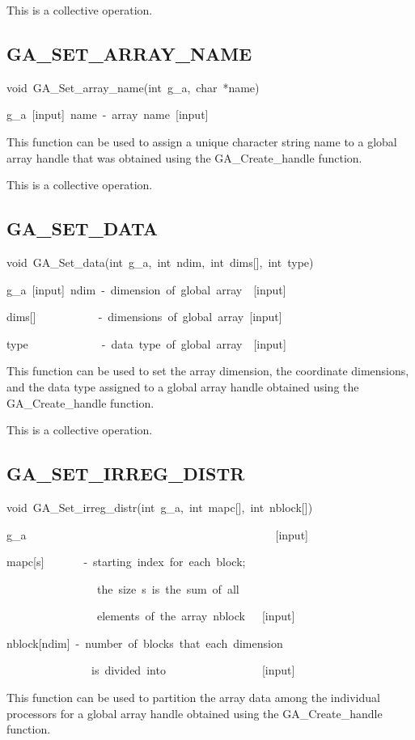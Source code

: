 This is a collective operation. 


\subsection*{\label{sub:GA_SET_ARRAY_NAME}GA\_SET\_ARRAY\_NAME}
\begin{lyxcode}
void~GA\_Set\_array\_name(int~g\_a,~char~{*}name)



g\_a~{[}input{]}~name~-~array~name~{[}input{]}
\end{lyxcode}
This function can be used to assign a unique character string name
to a global array handle that was obtained using the GA\_Create\_handle
function.

This is a collective operation. 


\subsection*{\label{sub:GA_SET_DATA}GA\_SET\_DATA}
\begin{lyxcode}
void~GA\_Set\_data(int~g\_a,~int~ndim,~int~dims{[}{]},~int~type)



g\_a~{[}input{]}~ndim~-~dimension~of~global~array~~{[}input{]}~

dims{[}{]}~~~~~~~~~~~-~dimensions~of~global~array~{[}input{]}~

type~~~~~~~~~~~~~-~data~type~of~global~array~~{[}input{]}
\end{lyxcode}
This function can be used to set the array dimension, the coordinate
dimensions, and the data type assigned to a global array handle obtained
using the GA\_Create\_handle function.

This is a collective operation. 


\subsection*{\label{sub:GA_SET_IRREG_DISTR}GA\_SET\_IRREG\_DISTR}
\begin{lyxcode}
void~GA\_Set\_irreg\_distr(int~g\_a,~int~mapc{[}{]},~int~nblock{[}{]})



g\_a~~~~~~~~~~~~~~~~~~~~~~~~~~~~~~~~~~~~~~~~~~~~{[}input{]}~

mapc{[}s{]}~~~~~~~-~starting~index~for~each~block;~

~~~~~~~~~~~~~~~~the~size~s~is~the~sum~of~all~

~~~~~~~~~~~~~~~~elements~of~the~array~nblock~~~{[}input{]}~

nblock{[}ndim{]}~-~number~of~blocks~that~each~dimension~

~~~~~~~~~~~~~~~is~divided~into~~~~~~~~~~~~~~~~~{[}input{]}
\end{lyxcode}
This function can be used to partition the array data among the individual
processors for a global array handle obtained using the GA\_Create\_handle
function.

